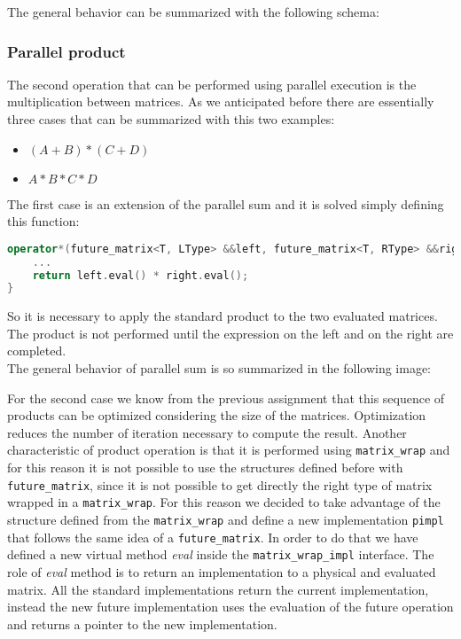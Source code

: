 \documentclass[10pt,a4paper]{article}
\begin{document}
The general behavior can be summarized with the following schema:

\subsubsection{Parallel product}\label{parallel_prod}
The second operation that can be performed using parallel execution is the multiplication between matrices. As we anticipated before there are essentially three cases that can be summarized with this two examples:
\begin{itemize}
	\item $(A+B) * (C+D)$
	\item $A*B*C*D$
\end{itemize}
The first case is an extension of the parallel sum and it is solved simply defining this function:
\begin{lstlisting}[language=C++]
operator*(future_matrix<T, LType> &&left, future_matrix<T, RType> &&right) {
	...
	return left.eval() * right.eval();
}
\end{lstlisting}
So it is necessary to apply the standard product to the two evaluated matrices. The product is not performed until the expression on the left and on the right are completed.\\
The general behavior of parallel sum is so summarized in the following image:

For the second case we know from the previous assignment that this sequence of products can be optimized considering the size of the matrices. Optimization reduces the number of iteration necessary to compute the result. Another characteristic of product operation is that it is performed using \verb|matrix_wrap| and for this reason it is not possible to use the structures defined before with \verb|future_matrix|, since it is not possible to get directly the right type of matrix wrapped in a \verb|matrix_wrap|. For this reason we decided to take advantage of the structure defined from the \verb|matrix_wrap| and define a new implementation \verb|pimpl| that follows the same idea of a \verb|future_matrix|. In order to do that we have defined a new virtual method \textit{eval} inside the \verb|matrix_wrap_impl| interface. The role of \textit{eval} method is to return an implementation to a physical and evaluated matrix. All the standard implementations return the current implementation, instead the new future implementation uses the evaluation of the future operation and returns a pointer to the new implementation.
\end{document}
